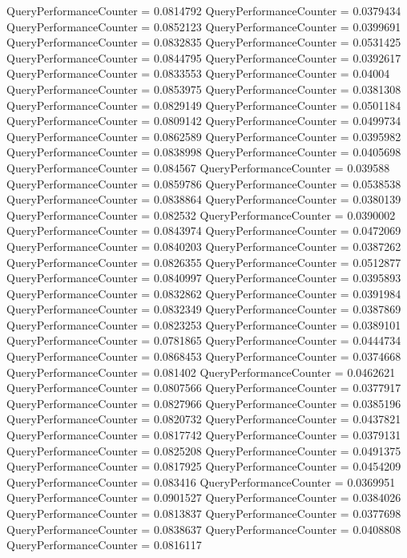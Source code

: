 \documentclass[9pt]{article}
\theoremstyle{plain}
\theoremstyle{definition}
\theoremstyle{remark}
\numberwithin{equation}{section}
\begin{document}
QueryPerformanceCounter  =  0.0814792
QueryPerformanceCounter  =  0.0379434
QueryPerformanceCounter  =  0.0852123
QueryPerformanceCounter  =  0.0399691
QueryPerformanceCounter  =  0.0832835
QueryPerformanceCounter  =  0.0531425
QueryPerformanceCounter  =  0.0844795
QueryPerformanceCounter  =  0.0392617
QueryPerformanceCounter  =  0.0833553
QueryPerformanceCounter  =  0.04004
QueryPerformanceCounter  =  0.0853975
QueryPerformanceCounter  =  0.0381308
QueryPerformanceCounter  =  0.0829149
QueryPerformanceCounter  =  0.0501184
QueryPerformanceCounter  =  0.0809142
QueryPerformanceCounter  =  0.0499734
QueryPerformanceCounter  =  0.0862589
QueryPerformanceCounter  =  0.0395982
QueryPerformanceCounter  =  0.0838998
QueryPerformanceCounter  =  0.0405698
QueryPerformanceCounter  =  0.084567
QueryPerformanceCounter  =  0.039588
QueryPerformanceCounter  =  0.0859786
QueryPerformanceCounter  =  0.0538538
QueryPerformanceCounter  =  0.0838864
QueryPerformanceCounter  =  0.0380139
QueryPerformanceCounter  =  0.082532
QueryPerformanceCounter  =  0.0390002
QueryPerformanceCounter  =  0.0843974
QueryPerformanceCounter  =  0.0472069
QueryPerformanceCounter  =  0.0840203
QueryPerformanceCounter  =  0.0387262
QueryPerformanceCounter  =  0.0826355
QueryPerformanceCounter  =  0.0512877
QueryPerformanceCounter  =  0.0840997
QueryPerformanceCounter  =  0.0395893
QueryPerformanceCounter  =  0.0832862
QueryPerformanceCounter  =  0.0391984
QueryPerformanceCounter  =  0.0832349
QueryPerformanceCounter  =  0.0387869
QueryPerformanceCounter  =  0.0823253
QueryPerformanceCounter  =  0.0389101
QueryPerformanceCounter  =  0.0781865
QueryPerformanceCounter  =  0.0444734
QueryPerformanceCounter  =  0.0868453
QueryPerformanceCounter  =  0.0374668
QueryPerformanceCounter  =  0.081402
QueryPerformanceCounter  =  0.0462621
QueryPerformanceCounter  =  0.0807566
QueryPerformanceCounter  =  0.0377917
QueryPerformanceCounter  =  0.0827966
QueryPerformanceCounter  =  0.0385196
QueryPerformanceCounter  =  0.0820732
QueryPerformanceCounter  =  0.0437821
QueryPerformanceCounter  =  0.0817742
QueryPerformanceCounter  =  0.0379131
QueryPerformanceCounter  =  0.0825208
QueryPerformanceCounter  =  0.0491375
QueryPerformanceCounter  =  0.0817925
QueryPerformanceCounter  =  0.0454209
QueryPerformanceCounter  =  0.083416
QueryPerformanceCounter  =  0.0369951
QueryPerformanceCounter  =  0.0901527
QueryPerformanceCounter  =  0.0384026
QueryPerformanceCounter  =  0.0813837
QueryPerformanceCounter  =  0.0377698
QueryPerformanceCounter  =  0.0838637
QueryPerformanceCounter  =  0.0408808
QueryPerformanceCounter  =  0.0816117
\end{document}

